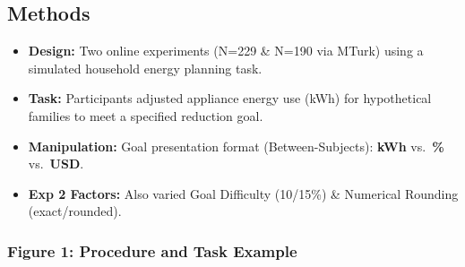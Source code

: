 \documentclass[
  12pt,
]{article}
\providecommand{\tightlist}{%
  \setlength{\itemsep}{0pt}\setlength{\parskip}{0pt}}
\begin{document}
\begin{multicols}{3}
\subsection{Methods}\label{methods}

\begin{itemize}
\tightlist
\item
  \textbf{Design:} Two online experiments (N=229 \& N=190 via MTurk)
  using a simulated household energy planning task.
\item
  \textbf{Task:} Participants adjusted appliance energy use (kWh) for
  hypothetical families to meet a specified reduction goal.
\item
  \textbf{Manipulation:} Goal presentation format (Between-Subjects):
  \textbf{kWh} vs.~\textbf{\%} vs.~\textbf{USD}.
\item
  \textbf{Exp 2 Factors:} Also varied Goal Difficulty (10/15\%) \&
  Numerical Rounding (exact/rounded).
\end{itemize}

\subsubsection{Figure 1: Procedure and Task
Example}\label{figure-1-procedure-and-task-example}

\begin{figure}[H]
\centering


\end{figure}
\end{multicols}
\end{document}

